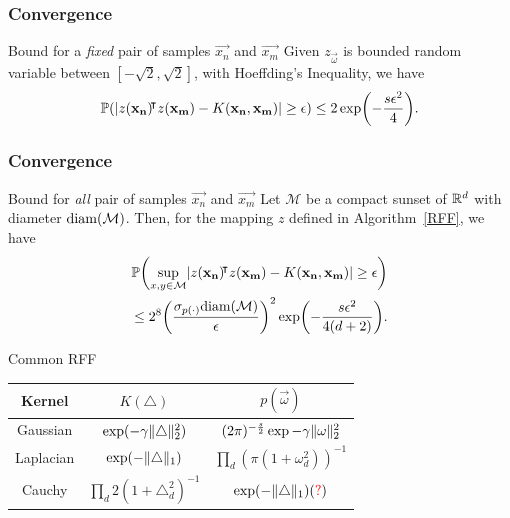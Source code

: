 \documentclass[10pt]{../formats/RU}
\begin{document}
\begin{frame}
  \frametitle{Convergence}
  \begin{exampleblock}{Bound for a \emph{fixed} pair of samples $\vec{x_n}$ and $\vec{x_m}$}
    Given $z_{\vec{\omega}}$ is bounded random variable between $[-\sqrt{2}, \sqrt{2}]$, with Hoeffding's Inequality, we have
    \begin{align*}
      \P{\abs{z(\vec{x_n})\trn z(\vec{x_m})-K(\vec{x_n}, \vec{x_m})}\geq \epsilon} \leq 2\exp\parens*{-\frac{s\epsilon^2}{4}}.
    \end{align*}      
  \end{exampleblock}
\end{frame}
\begin{frame}
  \frametitle{Convergence}
  \begin{exampleblock}{Bound for \emph{all} pair of samples $\vec{x_n}$ and $\vec{x_m}$}
    Let $\mathcal{M}$ be a compact sunset of $\mathbb{R}^d$ with diameter $\textnormal{diam}(\mathcal{M})$. Then, for the mapping $z$ defined in Algorithm~\ref{RFF}, we have
    \begin{align*}
      \P{\sup_{x,y\in\mathcal{M}}\abs{z(\vec{x_n})\trn z(\vec{x_m})-K(\vec{x_n}, \vec{x_m})}\geq \epsilon} \\
      \leq 2^8\parens*{\frac{\sigma_{p(\cdot)}\textnormal{diam}(\mathcal{M})}{\epsilon}}^2\exp\parens*{-\frac{s\epsilon^2}{4(d+2)}}.
    \end{align*}
  \end{exampleblock}
\end{frame}
\begin{frame}{Common RFF}
  \centering
  \begin{tabular}{c c c}
    Kernel & $K(\triangle)$ & $p(\vec{\omega})$ \\ 
    \hline
    Gaussian & $\exp(-\gamma\lVert\triangle\rVert_2^2)$ & $(2\pi)^{-\frac{s}{2}}\exp{-\gamma\lVert\mathbf{\omega}\rVert_2^2}$\\ 
    Laplacian & $\exp(-\lVert\triangle\rVert_1)$ & $\prod\limits_{d}(\pi(1+\omega_d^2))^{-1}$\\ 
    Cauchy & $\prod\limits_{d}2(1+\triangle_d^2)^{-1}$ & $\exp(-\lVert\triangle\rVert_1)(\textcolor{red}{\mathord{?}})$
  \end{tabular}
\end{frame}
\end{document}
